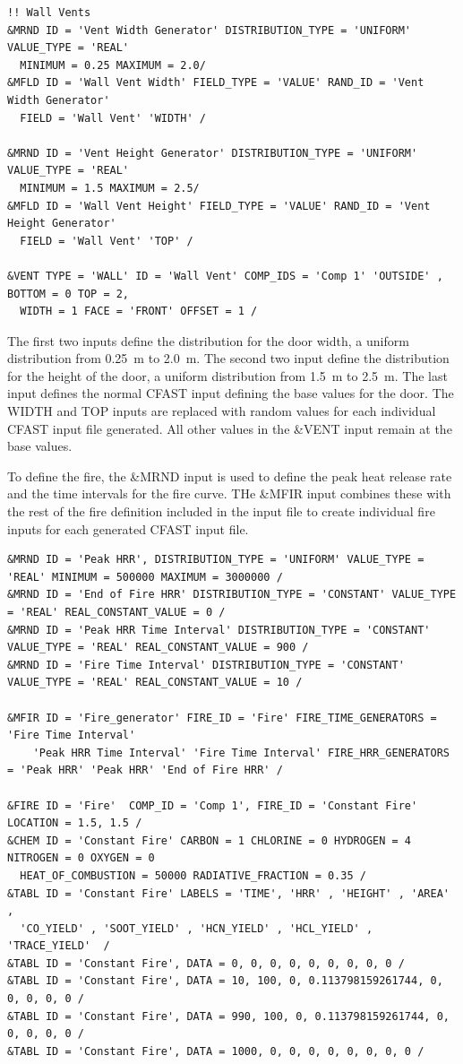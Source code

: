 \documentclass[12pt,twoside]{book}
\begin{document}
\begin{lstlisting}[basicstyle=\scriptsize]
!! Wall Vents
&MRND ID = 'Vent Width Generator' DISTRIBUTION_TYPE = 'UNIFORM' VALUE_TYPE = 'REAL'
  MINIMUM = 0.25 MAXIMUM = 2.0/
&MFLD ID = 'Wall Vent Width' FIELD_TYPE = 'VALUE' RAND_ID = 'Vent Width Generator'
  FIELD = 'Wall Vent' 'WIDTH' /

&MRND ID = 'Vent Height Generator' DISTRIBUTION_TYPE = 'UNIFORM' VALUE_TYPE = 'REAL'
  MINIMUM = 1.5 MAXIMUM = 2.5/
&MFLD ID = 'Wall Vent Height' FIELD_TYPE = 'VALUE' RAND_ID = 'Vent Height Generator'
  FIELD = 'Wall Vent' 'TOP' /

&VENT TYPE = 'WALL' ID = 'Wall Vent' COMP_IDS = 'Comp 1' 'OUTSIDE' , BOTTOM = 0 TOP = 2,
  WIDTH = 1 FACE = 'FRONT' OFFSET = 1 /
\end{lstlisting}

The first two inputs define the distribution for the door width, a uniform distribution from 0.25~m to 2.0~m. The second two input define the distribution for the height of the door, a uniform distribution from 1.5~m to 2.5~m. The last input defines the normal CFAST input defining the base values for the door. The {\ct WIDTH} and {\ct TOP} inputs are replaced with random values for each individual CFAST input file generated. All other values in the {\ct \&VENT} input remain at the base values.

To define the fire, the {\ct \&MRND} input is used to define the peak heat release rate and the time intervals for the fire curve. THe {\ct \&MFIR} input combines these with the rest of the fire definition included in the input file to create individual fire inputs for each generated CFAST input file.

\begin{lstlisting}[basicstyle=\scriptsize]
&MRND ID = 'Peak HRR', DISTRIBUTION_TYPE = 'UNIFORM' VALUE_TYPE = 'REAL' MINIMUM = 500000 MAXIMUM = 3000000 /
&MRND ID = 'End of Fire HRR' DISTRIBUTION_TYPE = 'CONSTANT' VALUE_TYPE = 'REAL' REAL_CONSTANT_VALUE = 0 /
&MRND ID = 'Peak HRR Time Interval' DISTRIBUTION_TYPE = 'CONSTANT' VALUE_TYPE = 'REAL' REAL_CONSTANT_VALUE = 900 /
&MRND ID = 'Fire Time Interval' DISTRIBUTION_TYPE = 'CONSTANT' VALUE_TYPE = 'REAL' REAL_CONSTANT_VALUE = 10 /

&MFIR ID = 'Fire_generator' FIRE_ID = 'Fire' FIRE_TIME_GENERATORS = 'Fire Time Interval'
    'Peak HRR Time Interval' 'Fire Time Interval' FIRE_HRR_GENERATORS = 'Peak HRR' 'Peak HRR' 'End of Fire HRR' /
    
&FIRE ID = 'Fire'  COMP_ID = 'Comp 1', FIRE_ID = 'Constant Fire'  LOCATION = 1.5, 1.5 /
&CHEM ID = 'Constant Fire' CARBON = 1 CHLORINE = 0 HYDROGEN = 4 NITROGEN = 0 OXYGEN = 0
  HEAT_OF_COMBUSTION = 50000 RADIATIVE_FRACTION = 0.35 /
&TABL ID = 'Constant Fire' LABELS = 'TIME', 'HRR' , 'HEIGHT' , 'AREA' , 
  'CO_YIELD' , 'SOOT_YIELD' , 'HCN_YIELD' , 'HCL_YIELD' , 'TRACE_YIELD'  /
&TABL ID = 'Constant Fire', DATA = 0, 0, 0, 0, 0, 0, 0, 0, 0 /
&TABL ID = 'Constant Fire', DATA = 10, 100, 0, 0.113798159261744, 0, 0, 0, 0, 0 /
&TABL ID = 'Constant Fire', DATA = 990, 100, 0, 0.113798159261744, 0, 0, 0, 0, 0 /
&TABL ID = 'Constant Fire', DATA = 1000, 0, 0, 0, 0, 0, 0, 0, 0 /
\end{lstlisting}
\end{document}
